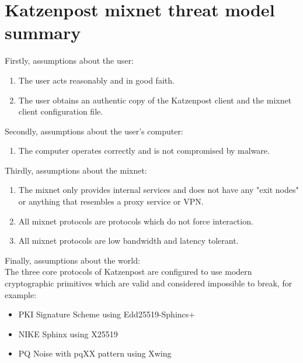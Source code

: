 \documentclass{article}
\begin{document}
\pagebreak

\section{Katzenpost mixnet threat model summary}

Firstly, assumptions about the user:\\

\begin{enumerate}
\item The user acts reasonably and in good faith.
\item The user obtains an authentic copy of the Katzenpost client and the mixnet client configuration file.
\end{enumerate}
\vspace*{5px}

\noindent Secondly, assumptions about the user's computer:\\

\begin{enumerate}
\item The computer operates correctly and is not compromised by malware.
\end{enumerate}
\vspace*{5px}

\noindent Thirdly, assumptions about the mixnet:\\

\begin{enumerate}
    \item The mixnet only provides internal services and does not have any "exit nodes" or anything that resembles a proxy service or VPN.
    \item All mixnet protocols are protocols which do not force interaction.
    \item All mixnet protocols are low bandwidth and latency tolerant.
\end{enumerate}

\noindent Finally, assumptions about the world:\\

The three core protocols of Katzenpost are configured to use modern cryptographic primitives which are valid and considered impossible to break, for example:

\begin{itemize}
  \item PKI Signature Scheme using Edd25519-Sphincs+
  \item NIKE Sphinx using X25519
  \item PQ Noise with pqXX pattern using Xwing
\end{itemize}
\vspace*{5px}
\end{document}
